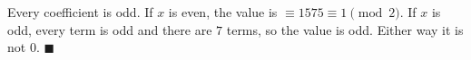 Every coefficient is odd. If $x$ is even, the value is $\equiv1575\equiv1\pmod2$. If $x$ is odd, every term is odd and there are $7$ terms, so the value is odd. Either way it is not $0$. $\blacksquare$
